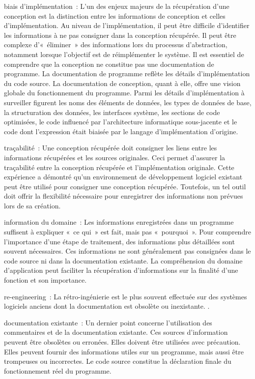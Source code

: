 {{}{
\item [1-] biais d'implémentation~: L'un des enjeux majeurs de la récupération d'une conception est la distinction entre les informations de conception et celles d'implémentation. Au niveau de l'implémentation, il peut être difficile d'identifier les informations à ne pas consigner dans la conception récupérée. Il peut être complexe d'«~éliminer~» des informations lors du processus d'abstraction, notamment lorsque l'objectif est de réimplémenter le système. Il est essentiel de comprendre que la conception ne constitue pas une documentation de programme. La documentation de programme reflète les détails d'implémentation du code source. La documentation de conception, quant à elle, offre une vision globale du fonctionnement du programme. Parmi les détails d'implémentation à surveiller figurent les noms des éléments de données, les types de données de base, la structuration des données, les interfaces système, les sections de code optimisées, le code influencé par l'architecture informatique sous-jacente et le code dont l'expression était biaisée par le langage d'implémentation d'origine.
\item [2-] traçabilité~: Une conception récupérée doit consigner les liens entre les informations récupérées et les sources originales. Ceci permet d'assurer la traçabilité entre la conception récupérée et l'implémentation originale. Cette expérience a démontré qu'un environnement de développement logiciel existant peut être utilisé pour consigner une conception récupérée. Toutefois, un tel outil doit offrir la flexibilité nécessaire pour enregistrer des informations non prévues lors de sa création.
\item [3-] information du domaine~: Les informations enregistrées dans un programme suffisent à expliquer «~ce qui~» est fait, mais pas «~pourquoi~». Pour comprendre l’importance d’une étape de traitement, des informations plus détaillées sont souvent nécessaires. Ces informations ne sont généralement pas consignées dans le code source ni dans la documentation existante. La compréhension du domaine d’application peut faciliter la récupération d’informations sur la finalité d’une fonction et son importance.
\item [4-] re-engineering~: La rétro-ingénierie est le plus souvent effectuée sur des systèmes logiciels anciens dont la documentation est obsolète ou inexistante. \elide.
\item [5-] documentation existante~: Un dernier point concerne l'utilisation des commentaires et de la documentation existante. Ces sources d'information peuvent être obsolètes ou erronées. Elles doivent être utilisées avec précaution. Elles peuvent fournir des informations utiles sur un programme, mais aussi être trompeuses ou incorrectes. Le code source constitue la déclaration finale du fonctionnement réel du programme.
}{\cite{byrne_re_1991}}

}
